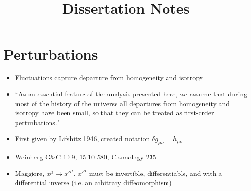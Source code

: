 \documentclass[10pt,letterpaper]{article}
\title{Dissertation Notes}
\date{}
\numberwithin{equation}{section}
\begin{document}
 
\maketitle
\noindent 
\section{Perturbations}
\begin{itemize}
	\item Fluctuations capture departure from homogeneity and isotropy
	\item ``As an essential feature of the analysis presented here, we assume that during most of the history of the universe all departures from homogeneity and isotropy have been small, so that they can be treated as first-order perturbations."
	\item First given by Lifshitz 1946, created notation $\delta g_{\mu\nu} = h_{\mu\nu}$
	\item Weinberg G\&C 10.9, 15.10 580, Cosmology 235
	\item Maggiore, $x^\mu \to x'^\mu$. $x'^\mu$ must be invertible, differentiable, and with a differential inverse (i.e. an arbitrary diffeomorphism)
\end{itemize}
\end{document}
